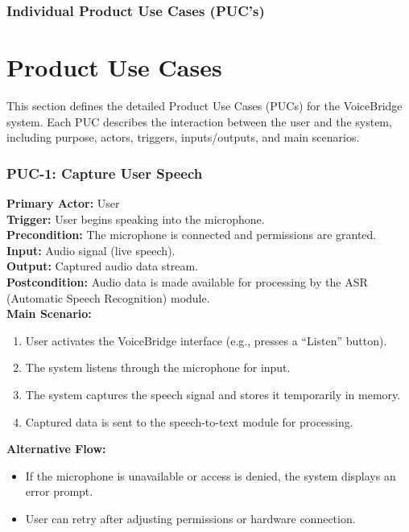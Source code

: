 \documentclass[11pt]{article}
\begin{document}
\subsubsection{Individual Product Use Cases (PUC's)}
\section*{Product Use Cases}

This section defines the detailed Product Use Cases (PUCs) for the VoiceBridge system. Each PUC describes the interaction between the user and the system, including purpose, actors, triggers, inputs/outputs, and main scenarios.

\subsubsection*{PUC-1: Capture User Speech}
\textbf{Primary Actor:} User \\
\textbf{Trigger:} User begins speaking into the microphone. \\
\textbf{Precondition:} The microphone is connected and permissions are granted. \\
\textbf{Input:} Audio signal (live speech). \\
\textbf{Output:} Captured audio data stream. \\
\textbf{Postcondition:} Audio data is made available for processing by the ASR (Automatic Speech Recognition) module. \\

\textbf{Main Scenario:}
\begin{enumerate}
  \item User activates the VoiceBridge interface (e.g., presses a “Listen” button).
  \item The system listens through the microphone for input.
  \item The system captures the speech signal and stores it temporarily in memory.
  \item Captured data is sent to the speech-to-text module for processing.
\end{enumerate}

\textbf{Alternative Flow:}
\begin{itemize}
  \item If the microphone is unavailable or access is denied, the system displays an error prompt.
  \item User can retry after adjusting permissions or hardware connection.
\end{itemize}
\end{document}

